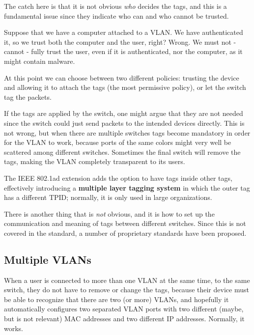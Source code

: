 The catch here is that it is not obvious \textit{who} decides the tags, and this is a fundamental issue since they indicate who can and who cannot be trusted.

Suppose that we have a computer attached to a VLAN. We have authenticated it, so we trust both the computer and the user, right? Wrong. We must not - cannot - fully trust the user, even if it is authenticated, nor the computer, as it might contain malware.
 
At this point we can choose between two different policies: trusting the device and allowing it to attach the tags (the most permissive policy), or let the switch tag the packets.

If the tags are applied by the switch, one might argue that they are not needed since the switch could just send packets to the intended devices directly. This is not wrong, but when there are multiple switches tags become mandatory in order for the VLAN to work, because ports of the same colors might very well be scattered among different switches. Sometimes the final switch will remove the tags, making the VLAN completely transparent to its users.

The IEEE 802.1ad extension adds the option to have tags inside other tags, effectively introducing a \textbf{multiple layer tagging system} in which the outer tag has a different TPID; normally, it is only used in large organizations.

There is another thing that is \textit{not} obvious, and it is how to set up the communication and meaning of tags between different switches. Since this is not covered in the standard, a number of proprietary standards have been proposed.

\subsection{Multiple VLANs}
When a user is connected to more than one VLAN at the same time, to the same switch, they do not have to remove or change the tags, because their device must be able to recognize that there are two (or more) VLANs, and hopefully it automatically configures two separated VLAN ports with two different (maybe, but is not relevant) MAC addresses and two different IP addresses. Normally, it works.


